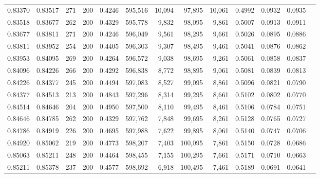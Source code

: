 \begin{tabular}{rrrrrrrrrrrrr}
0.83370 & 0.83517 &   271 & 200 &                                     0.4246 & 595,516 &  10,094 &  97,895 &  10,061 & 0.4992 & 0.0932 & 0.0935 \\
0.83518 & 0.83677 &   262 & 200 &                                     0.4329 & 595,778 &   9,832 &  98,095 &   9,861 & 0.5007 & 0.0913 & 0.0911 \\
0.83677 & 0.83811 &   271 & 200 &                                     0.4246 & 596,049 &   9,561 &  98,295 &   9,661 & 0.5026 & 0.0895 & 0.0886 \\
0.83811 & 0.83952 &   254 & 200 &                                     0.4405 & 596,303 &   9,307 &  98,495 &   9,461 & 0.5041 & 0.0876 & 0.0862 \\
0.83953 & 0.84095 &   269 & 200 &                                     0.4264 & 596,572 &   9,038 &  98,695 &   9,261 & 0.5061 & 0.0858 & 0.0837 \\
0.84096 & 0.84226 &   266 & 200 &                                     0.4292 & 596,838 &   8,772 &  98,895 &   9,061 & 0.5081 & 0.0839 & 0.0813 \\
0.84226 & 0.84377 &   245 & 200 &                                     0.4494 & 597,083 &   8,527 &  99,095 &   8,861 & 0.5096 & 0.0821 & 0.0790 \\
0.84377 & 0.84513 &   213 & 200 &                                     0.4843 & 597,296 &   8,314 &  99,295 &   8,661 & 0.5102 & 0.0802 & 0.0770 \\
0.84514 & 0.84646 &   204 & 200 &                                     0.4950 & 597,500 &   8,110 &  99,495 &   8,461 & 0.5106 & 0.0784 & 0.0751 \\
0.84646 & 0.84785 &   262 & 200 &                                     0.4329 & 597,762 &   7,848 &  99,695 &   8,261 & 0.5128 & 0.0765 & 0.0727 \\
0.84786 & 0.84919 &   226 & 200 &                                     0.4695 & 597,988 &   7,622 &  99,895 &   8,061 & 0.5140 & 0.0747 & 0.0706 \\
0.84920 & 0.85062 &   219 & 200 &                                     0.4773 & 598,207 &   7,403 & 100,095 &   7,861 & 0.5150 & 0.0728 & 0.0686 \\
0.85063 & 0.85211 &   248 & 200 &                                     0.4464 & 598,455 &   7,155 & 100,295 &   7,661 & 0.5171 & 0.0710 & 0.0663 \\
0.85211 & 0.85378 &   237 & 200 &                                     0.4577 & 598,692 &   6,918 & 100,495 &   7,461 & 0.5189 & 0.0691 & 0.0641 \\

\end{tabular}
